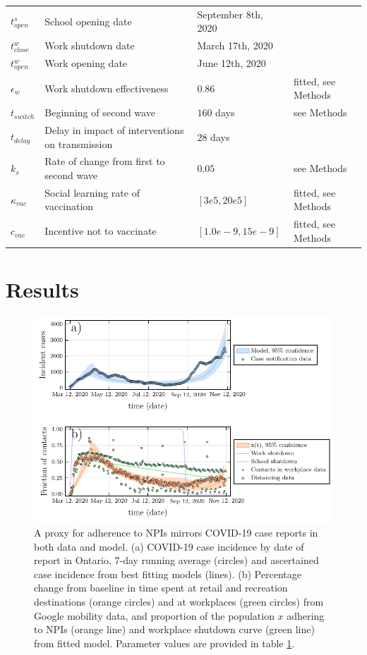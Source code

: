 \begin{table}[H]
\begin{tabular}{l p{5.5cm} l l}
  $ t^s_{open} $ & School opening date & September 8th, 2020 &  \cite{school_opening} \\
  $ t^w_{close} $ &   Work shutdown date & March 17th, 2020 & \cite{ontario_reopening}\\
  $ t^w_{open}  $ & Work opening date &  June 12th, 2020 & \cite{ontario_reopening}\\
  $ \epsilon_w $ & Work shutdown effectiveness & $0.86$ & fitted, see Methods \\
  $ t_{switch} $ & Beginning of second wave & $160 $ days &  see Methods \\ 
  $ t_{delay} $ & Delay in impact of interventions on transmission & $28$ days &  \cite{li2020temporal} \\ 
  $k_s$ & Rate of change from first to second wave & $0.05$ &  see Methods \\ 
  $ \kappa_{vac}$ & Social learning rate of vaccination & $[3e5,20e5] $& fitted, see Methods \\
  $ c_{vac}$ & Incentive not to vaccinate & $[1.0e-9,15e-9]$& fitted, see Methods \\
  \bottomrule  
  \end{tabular}
  \label{tab:params}
  \end{table}
\normalsize



\section{Results} 

\begin{figure}
\includegraphics[width=\textwidth]{chapter_1/plot_model.pdf} 
\caption{A proxy for adherence to NPIs mirrors COVID-19 case reports in both data and model. (a) COVID-19 case incidence by date of report in Ontario, 7-day running average (circles) and ascertained case incidence from best fitting models (lines). (b) Percentage change from baseline in time spent at retail and recreation destinations (orange circles) and at workplaces (green circles) from Google mobility data, and proportion of the population $x$ adhering to NPIs (orange line) and workplace shutdown curve (green line) from fitted model.  Parameter values are provided in table \ref{tab:params}.}
\label{fig1}
\end{figure}

